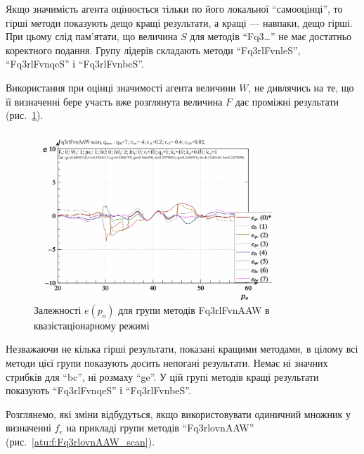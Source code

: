 Якщо значимість агента оцінюється тільки по його локальної
``самооцінці'', то гірші методи показують дещо кращі результати, а
кращі --- навпаки, дещо гірші. При цьому слід пам'ятати, що величина
$S$ для методів ``Fq3\ldots'' не має достатньо коректного
подання. Групу лідерів складають методи ``Fq3rlFvnleS'', ``Fq3rlFvnqeS'' і
``Fq3rlFvnbeS''.

Використання при оцінці значимості агента величини
$ W $, не дивлячись на те, що її визначенні бере участь вже
розглянута величина
$ F $ дає проміжні результати (рис.~\ref{atu:f:Fq3rlFvnAAW_scan}).

\begin{figure}[htb!]
  \begin{center}
    \includegraphics[width=0.8\textwidth]{p/scan/qls-p_p_e_Fq3rlFvnAAW_scan.png}
  \end{center}
  \caption{Залежності $e(p_o)$ для групи методів Fq3rlFvnAAW в квазістаціонарному режимі}
  \label{atu:f:Fq3rlFvnAAW_scan}
\end{figure}

Незважаючи не кілька гірші результати, показані кращими
методами, в цілому всі методи цієї групи показують досить
непогані результати. Немає ні значних стрибків для ``bc'', ні
розмаху ``ge''. У цій групі методів кращі результати показують
``Fq3rlFvnqeS'' і ``Fq3rlFvnbeS''.


Розглянемо, які зміни відбудуться, якщо використовувати
одиничний множник у визначенні
$ f_e $ на прикладі групи методів ``Fq3rlovnAAW'' (рис.~\ref{atu:f:Fq3rlovnAAW_scan}).

